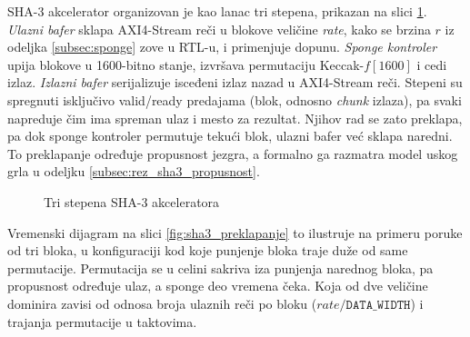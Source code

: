 SHA-3 akcelerator organizovan je kao lanac tri stepena, prikazan na slici \ref{fig:sha3_stepeni}. \textit{Ulazni bafer} sklapa AXI4-Stream reči u blokove veličine \textit{rate}, kako se brzina $r$ iz odeljka \ref{subsec:sponge} zove u RTL-u, i primenjuje dopunu. \textit{Sponge kontroler} upija blokove u 1600-bitno stanje, izvršava permutaciju Keccak-$f[1600]$ i cedi izlaz. \textit{Izlazni bafer} serijalizuje isceđeni izlaz nazad u AXI4-Stream reči. Stepeni su spregnuti isključivo valid/ready predajama (blok, odnosno \textit{chunk} izlaza), pa svaki napreduje čim ima spreman ulaz i mesto za rezultat. Njihov rad se zato preklapa, pa dok sponge kontroler permutuje tekući blok, ulazni bafer već sklapa naredni. To preklapanje određuje propusnost jezgra, a formalno ga razmatra model uskog grla u odeljku \ref{subsec:rez_sha3_propusnost}.

\begin{figure}[H]
\centering
{}
\caption{Tri stepena SHA-3 akceleratora}
\label{fig:sha3_stepeni}
\end{figure}

Vremenski dijagram na slici \ref{fig:sha3_preklapanje} to ilustruje na primeru poruke od tri bloka, u konfiguraciji kod koje punjenje bloka traje duže od same permutacije. Permutacija se u celini sakriva iza punjenja narednog bloka, pa propusnost određuje ulaz, a sponge deo vremena čeka. Koja od dve veličine dominira zavisi od odnosa broja ulaznih reči po bloku ($rate/\mathtt{DATA\_WIDTH}$) i trajanja permutacije u taktovima.

